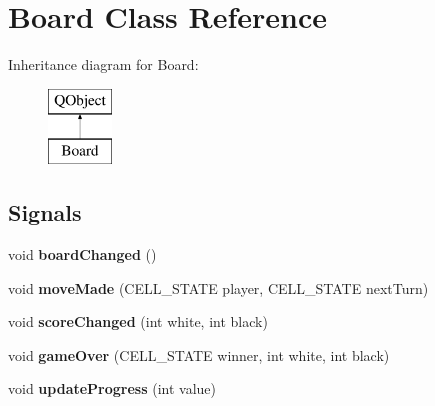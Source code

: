 \hypertarget{class_board}{}\section{Board Class Reference}
\label{class_board}
Inheritance diagram for Board\+:\begin{figure}[H]
\begin{center}
\leavevmode
\includegraphics[height=2.000000cm]{class_board}
\end{center}
\end{figure}
\subsection*{Signals}
\begin{DoxyCompactItemize}
\item 
\hypertarget{class_board_a480fd8af3e8604d0568343dc2544903f}{}void {\bfseries board\+Changed} ()\label{class_board_a480fd8af3e8604d0568343dc2544903f}

\item 
\hypertarget{class_board_ae3a8556db5dcad7eb769f02c796b79d7}{}void {\bfseries move\+Made} (C\+E\+L\+L\+\_\+\+S\+T\+A\+T\+E player, C\+E\+L\+L\+\_\+\+S\+T\+A\+T\+E next\+Turn)\label{class_board_ae3a8556db5dcad7eb769f02c796b79d7}

\item 
\hypertarget{class_board_ad2a91234a1dfee298227dd8b10ce3446}{}void {\bfseries score\+Changed} (int white, int black)\label{class_board_ad2a91234a1dfee298227dd8b10ce3446}

\item 
\hypertarget{class_board_a7b96a501e83fe48ff825e73ad98fa929}{}void {\bfseries game\+Over} (C\+E\+L\+L\+\_\+\+S\+T\+A\+T\+E winner, int white, int black)\label{class_board_a7b96a501e83fe48ff825e73ad98fa929}

\item 
\hypertarget{class_board_a7cbf14fa69c5689b3dceeda86d3a15f5}{}void {\bfseries update\+Progress} (int value)\label{class_board_a7cbf14fa69c5689b3dceeda86d3a15f5}

\end{DoxyCompactItemize}
